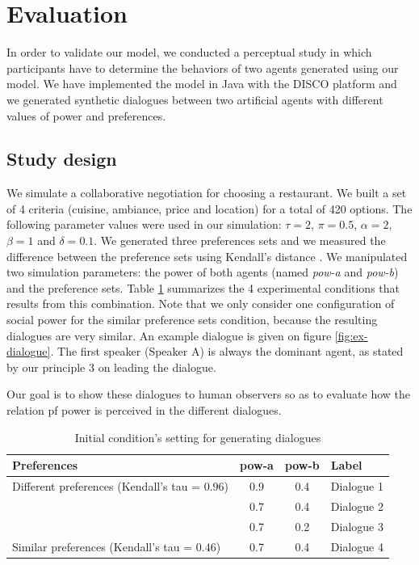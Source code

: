 \documentclass{llncs}
\begin{document}
	\section{Evaluation}
	\label{sec:evaluation}
	
	In order to validate our model, we conducted a perceptual study in which participants have to determine the behaviors of two agents generated using our model. We have implemented the model in Java with the DISCO platform \cite{rich09} and we generated synthetic dialogues between two artificial agents with different values of power and preferences.

	\subsection{Study design}
	We simulate a collaborative negotiation for choosing a restaurant. We built a set of 4 criteria (cuisine, ambiance, price and location) for a total of 420 options. The following parameter values were used in our simulation: $\tau=2$, $\pi=0.5$, $\alpha=2$, $\beta=1$ and $\delta=0.1$. We generated three preferences sets and we measured the difference between the preference sets using Kendall's distance \cite{bra2013Kendall}. We manipulated two simulation parameters: the power of both agents (named \emph{pow-a} and \emph{pow-b}) and the preference sets. Table \ref{table:conditions} summarizes the 4 experimental conditions that results from this combination. Note that we only consider one configuration of social power for the similar preference sets condition, because the resulting dialogues are very similar. An example dialogue is given on figure \ref{fig:ex-dialogue}. The first speaker (Speaker A) is always the dominant agent, as stated by our principle 3 on leading the dialogue.
	
	Our goal is to show these dialogues to human observers so as to evaluate how the relation pf power is perceived in the different dialogues.
	\begin{table}
		\centering
		\begin{tabular}{ |l|c|c|l| }
			\hline
			\textbf{Preferences}& \textbf{pow-a} & \textbf{pow-b} & \textbf{Label} \\ 
			\hline
			\newline\multirow{3}{*} {Different preferences (Kendall's tau = $0.96$)} & 0.9 & 0.4 & Dialogue 1 \\ \cline{2-4}
			
			\newline  & 0.7 & 0.4 & Dialogue 2\\ \cline{2-4}
			
			\newline   &0.7 & 0.2 & Dialogue 3\\ 
			\hline
			\newline Similar preferences (Kendall's tau = $0.46$) & 0.7 & 0.4 & Dialogue 4\\
			\hline
		\end{tabular}
		\caption{Initial condition's setting for generating dialogues} 
		\label{table:conditions}
	\end{table}
	
\end{document}
